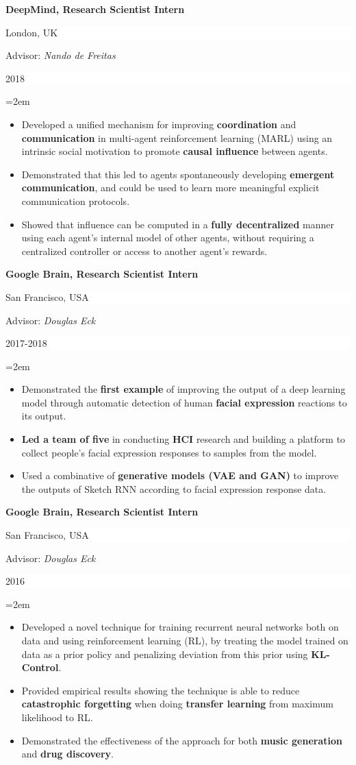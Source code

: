 \documentclass[paper=letter,fontsize=11pt]{scrartcl} %
\newcommand{\sepspace}{\vspace*{1em}}		%
\newcommand{\ResearchEntry}[5]{
		\noindent \textbf{#1} \hfill      %
		\colorbox{White}{%
			\parbox{10em}{%
			\hfill\color{Black}#2}} \par  %
		\noindent Advisor: \textit{#3} \hfill      %
		\colorbox{White}{%
			\parbox{6em}{%
			\hfill\color{Black}#4}} \par  %
		\noindent\hangindent=2em\hangafter=0 \small #5 %
		\normalsize \par}
\begin{document}
\ResearchEntry{DeepMind, Research Scientist Intern}{London, UK}{Nando de Freitas}{2018}
{\begin{itemize}
    \item Developed a unified mechanism for improving \textbf{coordination} and \textbf{communication} in multi-agent reinforcement learning (MARL) using an intrinsic social motivation to promote \textbf{causal influence} between agents.
    \item Demonstrated that this led to agents spontaneously developing \textbf{emergent communication}, and could be used to learn more meaningful explicit communication protocols. 
    \item Showed that influence can be computed in a \textbf{fully decentralized} manner using each agent's internal model of other agents, without requiring a centralized controller or access to another agent's rewards.
\end{itemize}}
\sepspace

\ResearchEntry{Google Brain, Research Scientist Intern}{San Francisco, USA}{Douglas Eck}{2017-2018}
{\begin{itemize}
    \item Demonstrated the \textbf{first example} of improving the output of a deep learning model through automatic detection of human \textbf{facial expression} reactions to its output.
    \item \textbf{Led a team of five} in conducting \textbf{HCI} research and building a platform to collect people's facial expression responses to samples from the model. 
    \item Used a combinative of \textbf{generative models (VAE and GAN)} to improve the outputs of Sketch RNN according to facial expression response data. 
\end{itemize}}
\sepspace

\ResearchEntry{Google Brain, Research Scientist Intern}{San Francisco, USA}{Douglas Eck}{2016}
{\begin{itemize}
    \item Developed a novel technique for training recurrent neural networks both on data and using reinforcement learning (RL), by treating the model trained on data as a prior policy and penalizing deviation from this prior using \textbf{KL-Control}.
    \item Provided empirical results showing the technique is able to reduce \textbf{catastrophic forgetting} when doing \textbf{transfer learning} from maximum likelihood to RL. 
    \item Demonstrated the effectiveness of the approach for both \textbf{music generation} and \textbf{drug discovery}.
\end{itemize}}
\sepspace
\end{document}
